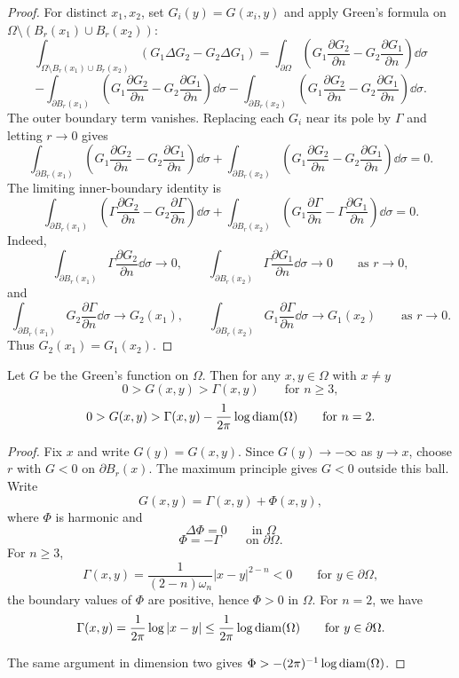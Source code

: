 \begin{proof}
\sketch For distinct $x_1,x_2$, set $G_i(y)=G(x_i,y)$ and apply Green's formula
on $\Omega\setminus(B_r(x_1)\cup B_r(x_2))$:
\[
\int_{\Omega\setminus B_r(x_1)\cup B_r(x_2)}
(G_1\Delta G_2-G_2\Delta G_1)
=\int_{\partial\Omega}\left(G_1\frac{\partial G_2}{\partial n}-G_2\frac{\partial G_1}{\partial n}\right)\dd\sigma
\]
\[
-\int_{\partial B_r(x_1)}\left(G_1\frac{\partial G_2}{\partial n}-G_2\frac{\partial G_1}{\partial n}\right)\dd\sigma
-\int_{\partial B_r(x_2)}\left(G_1\frac{\partial G_2}{\partial n}-G_2\frac{\partial G_1}{\partial n}\right)\dd\sigma.
\]
The outer boundary term vanishes. Replacing each $G_i$ near its pole by
$\Gamma$ and letting $r\to0$ gives
\[
\int_{\partial B_r(x_1)}\left(G_1\frac{\partial G_2}{\partial n}-G_2\frac{\partial G_1}{\partial n}\right)\dd\sigma
+\int_{\partial B_r(x_2)}\left(G_1\frac{\partial G_2}{\partial n}-G_2\frac{\partial G_1}{\partial n}\right)\dd\sigma=0.
\]
The limiting inner-boundary identity is
\[
\int_{\partial B_r(x_1)}\left(\Gamma\frac{\partial G_2}{\partial n}-G_2\frac{\partial \Gamma}{\partial n}\right)\dd\sigma
+\int_{\partial B_r(x_2)}\left(G_1\frac{\partial \Gamma}{\partial n}-\Gamma\frac{\partial G_1}{\partial n}\right)\dd\sigma=0.
\]
Indeed,
\[
\int_{\partial B_r(x_1)}\Gamma\frac{\partial G_2}{\partial n}\dd\sigma\to 0,\qquad
\int_{\partial B_r(x_2)}\Gamma\frac{\partial G_1}{\partial n}\dd\sigma\to 0
\qquad \text{as }r\to 0,
\]
and
\[
\int_{\partial B_r(x_1)}G_2\frac{\partial \Gamma}{\partial n}\dd\sigma\to G_2(x_1),\qquad
\int_{\partial B_r(x_2)}G_1\frac{\partial \Gamma}{\partial n}\dd\sigma\to G_1(x_2)
\qquad \text{as }r\to 0.
\]
Thus $G_2(x_1)=G_1(x_2)$.
\end{proof}

\begin{proposition}\label{hanlin:prop-green-sign}
Let $G$ be the Green's function on $\Omega$. Then for any $x,y\in\Omega$
with $x\neq y$
\[
0>G(x,y)>\Gamma(x,y)\qquad \text{for }n\ge 3,
\]
\[
0>G(x,y)>\Gamma(x,y)-\frac{1}{2\pi}\log \operatorname{diam}(\Omega)\qquad \text{for }n=2.
\]
\end{proposition}
\begin{proof}
\sketch Fix $x$ and write $G(y)=G(x,y)$. Since $G(y)\to-\infty$ as $y\to x$,
choose $r$ with $G<0$ on $\partial B_r(x)$. The maximum principle gives $G<0$
outside this ball. Write
\[
G(x,y)=\Gamma(x,y)+\Phi(x,y),
\]
where $\Phi$ is harmonic and
\[
\Delta \Phi=0 \qquad \text{in }\Omega
\]
\[
\Phi=-\Gamma \qquad \text{on }\partial\Omega.
\]
For $n\ge3$,
\[
\Gamma(x,y)=\frac{1}{(2-n)\omega_n}|x-y|^{2-n}<0 \qquad \text{for } y\in\partial\Omega,
\]
the boundary values of $\Phi$ are positive, hence $\Phi>0$ in $\Omega$.
For $n=2$, we have
\[
\Gamma(x,y)=\frac{1}{2\pi}\log |x-y|\le \frac{1}{2\pi}\log \operatorname{diam}(\Omega)\qquad \text{for } y\in\partial\Omega.
\]

The same argument in dimension two gives
$\Phi>-(2\pi)^{-1}\log\operatorname{diam}(\Omega)$.
\end{proof}

